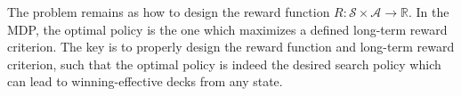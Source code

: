 




The problem remains as how to design the reward function $R: \mathcal{S} \times \mathcal{A} \rightarrow \mathbb{R}$. In the MDP, the optimal policy is the one which maximizes a defined long-term reward criterion. The  key is to properly design the reward function and long-term reward criterion, such that the optimal policy is indeed the desired search policy which can lead to winning-effective decks from any state. 

